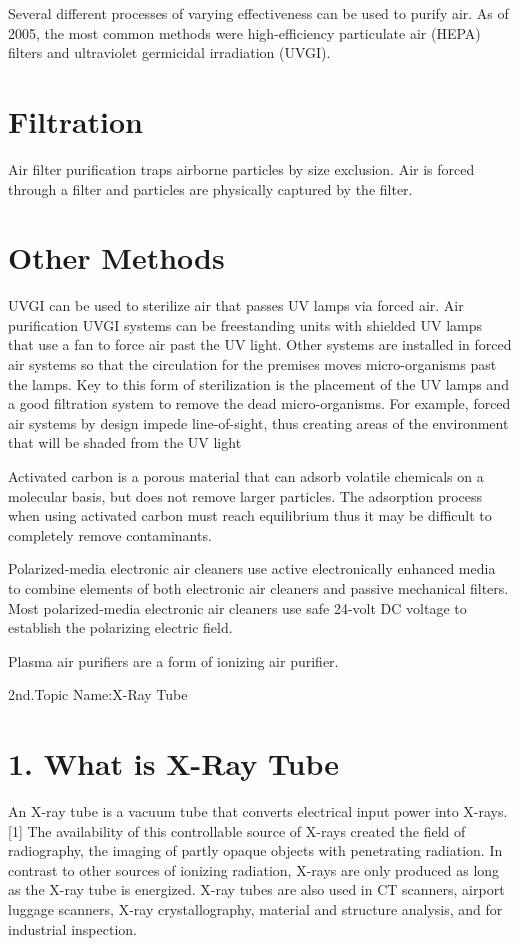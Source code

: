 \documentclass[12pt]{article}
\begin{document}
Several different processes of varying effectiveness can be used to purify air. As of 2005, the most common methods were high-efficiency particulate air (HEPA) filters and ultraviolet germicidal irradiation (UVGI).

\section{Filtration}
Air filter purification traps airborne particles by size exclusion. Air is forced through a filter and particles are physically captured by the filter.

\section{Other Methods}
UVGI can be used to sterilize air that passes UV lamps via forced air. Air purification UVGI systems can be freestanding units with shielded UV lamps that use a fan to force air past the UV light. Other systems are installed in forced air systems so that the circulation for the premises moves micro-organisms past the lamps. Key to this form of sterilization is the placement of the UV lamps and a good filtration system to remove the dead micro-organisms. For example, forced air systems by design impede line-of-sight, thus creating areas of the environment that will be shaded from the UV light

Activated carbon is a porous material that can adsorb volatile chemicals on a molecular basis, but does not remove larger particles. The adsorption process when using activated carbon must reach equilibrium thus it may be difficult to completely remove contaminants.

Polarized-media electronic air cleaners use active electronically enhanced media to combine elements of both electronic air cleaners and passive mechanical filters. Most polarized-media electronic air cleaners use safe 24-volt DC voltage to establish the polarizing electric field.

Plasma air purifiers are a form of ionizing air purifier.


\maketitle
\clearpage
2nd.Topic Name:X-Ray Tube

\section*{1. What is X-Ray Tube}
An X-ray tube is a vacuum tube that converts electrical input power into X-rays.[1] The availability of this controllable source of X-rays created the field of radiography, the imaging of partly opaque objects with penetrating radiation. In contrast to other sources of ionizing radiation, X-rays are only produced as long as the X-ray tube is energized. X-ray tubes are also used in CT scanners, airport luggage scanners, X-ray crystallography, material and structure analysis, and for industrial inspection.
\end{document}
